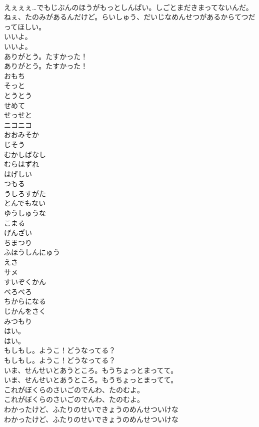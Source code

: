 \documentclass[8pt]{extreport}
\begin{document}
\begin{CJK}{UTF8}{min}
\\	えぇぇぇ…でもじぶんのほうがもっとしんぱい。しごとまだきまってないんだ。ねぇ、たのみがあるんだけど。らいしゅう、だいじなめんせつがあるからてつだってほしい。
\\	いいよ。
\\	いいよ。
\\	ありがとう。たすかった！
\\	ありがとう。たすかった！
\\	おもち
\\	そっと
\\	とうとう
\\	せめて
\\	せっせと
\\	ニコニコ
\\	おおみそか
\\	じそう
\\	むかしばなし
\\	むらはずれ
\\	はげしい
\\	つもる
\\	うしろすがた
\\	とんでもない
\\	ゆうしゅうな
\\	こまる
\\	げんざい
\\	ちまつり
\\	ふほうしんにゅう
\\	えさ
\\	サメ
\\	すいぞくかん
\\	べろべろ
\\	ちからになる
\\	じかんをさく
\\	みつもり
\\	はい。
\\	はい。
\\	もしもし。ようこ！どうなってる？
\\	もしもし。ようこ！どうなってる？
\\	いま、せんせいとあうところ。もうちょっとまってて。
\\	いま、せんせいとあうところ。もうちょっとまってて。
\\	これがぼくらのさいごのでんわ、たのむよ。
\\	これがぼくらのさいごのでんわ、たのむよ。
\\	わかったけど、ふたりのせいできょうのめんせついけな
\\	わかったけど、ふたりのせいできょうのめんせついけな

\end{CJK}
\end{document}
